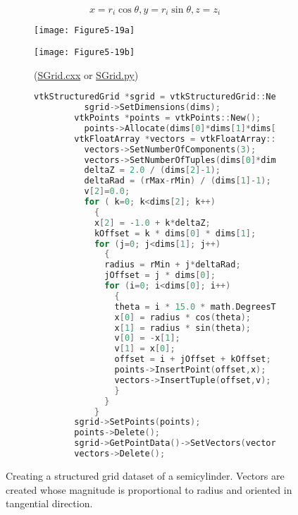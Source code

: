 \begin{equation}\label{eq:5.3}
x = r_i \cos\theta, y = r_i \sin\theta, z = z_i
\end{equation}

\begin{figure}[!htb]
	\begin{subfigure}[h]{0.48\linewidth}
		\texttt{[image: Figure5-19a]}
		\caption*{}
		\label{fig:Figure5-19a}
	\end{subfigure}
	\hfill
	\begin{subfigure}[h]{0.48\linewidth}
		\texttt{[image: Figure5-19b]}
		\caption*{(\href{https://lorensen.github.io/VTKExamples/site/Cxx/StructuredGrid/SGrid/}{SGrid.cxx} or \href{https://lorensen.github.io/VTKExamples/site/Python/StructuredGrid/SGrid/}{SGrid.py})}
		\label{fig:Figure5-19b}
	\end{subfigure}
	\hfill
	\begin{subfigure}[h]{0.96\linewidth}
		\caption*{}
	\end{subfigure}
	\hfill
	\begin{subfigure}[h]{0.96\linewidth}
		\begin{lstlisting}[language=C++, caption={}]
		vtkStructuredGrid *sgrid = vtkStructuredGrid::New();
		  sgrid->SetDimensions(dims);
		vtkPoints *points = vtkPoints::New();
		  points->Allocate(dims[0]*dims[1]*dims[2]);
		vtkFloatArray *vectors = vtkFloatArray::New();
		  vectors->SetNumberOfComponents(3);
		  vectors->SetNumberOfTuples(dims[0]*dims[1]*dims[2]);
		  deltaZ = 2.0 / (dims[2]-1);
		  deltaRad = (rMax-rMin) / (dims[1]-1);
		  v[2]=0.0;
		  for ( k=0; k<dims[2]; k++)
		    {
		    x[2] = -1.0 + k*deltaZ;
		    kOffset = k * dims[0] * dims[1];
		    for (j=0; j<dims[1]; j++)
		      {
		      radius = rMin + j*deltaRad;
		      jOffset = j * dims[0];
		      for (i=0; i<dims[0]; i++)
		        {
		        theta = i * 15.0 * math.DegreesToRadians();
		        x[0] = radius * cos(theta);
		        x[1] = radius * sin(theta);
		        v[0] = -x[1];
		        v[1] = x[0];
		        offset = i + jOffset + kOffset;
		        points->InsertPoint(offset,x);
		        vectors->InsertTuple(offset,v);
		        }
		      }
		    }
		sgrid->SetPoints(points);
		points->Delete();
		sgrid->GetPointData()->SetVectors(vectors);
		vectors->Delete();
		\end{lstlisting}
		\caption*{}
		\label{fig:Figure5-19c}
	\end{subfigure}
	\caption{Creating a structured grid dataset of a semicylinder. Vectors are created whose magnitude is proportional to radius and oriented in tangential direction.}\label{fig:Figure5-19}
\end{figure}

